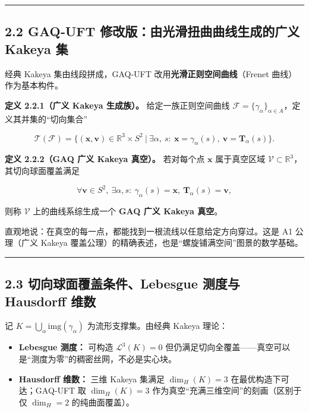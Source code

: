 \begin{center}\rule{0.5\linewidth}{0.5pt}\end{center}

\subsection{2.2 GAQ‑UFT 修改版：由光滑扭曲曲线生成的广义 Kakeya
集}\label{gaquft-ux4feeux6539ux7248ux7531ux5149ux6ed1ux626dux66f2ux66f2ux7ebfux751fux6210ux7684ux5e7fux4e49-kakeya-ux96c6}

经典 Kakeya 集由线段拼成，GAQ‑UFT 改用\textbf{光滑正则空间曲线}（Frenet
曲线）作为基本构件。

\textbf{定义 2.2.1（广义 Kakeya 生成族）。} 给定一族正则空间曲线
\(\mathcal{F}=\{\gamma_\alpha\}_{\alpha\in A}\)，定义其并集的``切向集合''

\[
\mathcal{T}(\mathcal{F})=\bigl\{(\mathbf{x},\mathbf{v})\in\mathbb{R}^3\times S^2\ \big|\ \exists\alpha,\ s:\ \mathbf{x}=\gamma_\alpha(s),\ \mathbf{v}=\mathbf{T}_\alpha(s)\bigr\}.
\]

\textbf{定义 2.2.2（GAQ 广义 Kakeya 真空）。} 若对每个点 \(\mathbf{x}\)
属于真空区域 \(\mathcal{V}\subset\mathbb{R}^3\)，其切向球面覆盖满足

\[
\forall \mathbf{v}\in S^2,\ \exists\alpha,s:\ \gamma_\alpha(s)=\mathbf{x},\ \mathbf{T}_\alpha(s)=\mathbf{v},
\]

则称 \(\mathcal{V}\) 上的曲线系综生成一个 \textbf{GAQ 广义 Kakeya
真空}。

直观地说：在真空的每一点，都能找到一根流线以任意给定方向穿过。这是 A1
公理（广义 Kakeya
覆盖公理）的精确表述，也是``螺旋铺满空间''图景的数学基础。

\begin{center}\rule{0.5\linewidth}{0.5pt}\end{center}

\subsection{2.3 切向球面覆盖条件、Lebesgue 测度与 Hausdorff
维数}\label{ux5207ux5411ux7403ux9762ux8986ux76d6ux6761ux4ef6lebesgue-ux6d4bux5ea6ux4e0e-hausdorff-ux7ef4ux6570}

记 \(K=\bigcup_\alpha \mathrm{img}(\gamma_\alpha)\) 为流形支撑集。由经典
Kakeya 理论：

\begin{itemize}
\tightlist
\item
  \textbf{Lebesgue 测度：} 可构造 \(\mathcal{L}^3(K)=0\)
  但仍满足切向全覆盖------真空可以是``测度为零''的稠密丝网，不必是实心块。
\item
  \textbf{Hausdorff 维数：} 三维 Kakeya 集满足 \(\dim_H(K)=3\)
  在最优构造下可达；GAQ‑UFT 取 \(\dim_H(K)=3\)
  作为真空``充满三维空间''的刻画（区别于仅 \(\dim_H=2\) 的纯曲面覆盖）。
\end{itemize}

